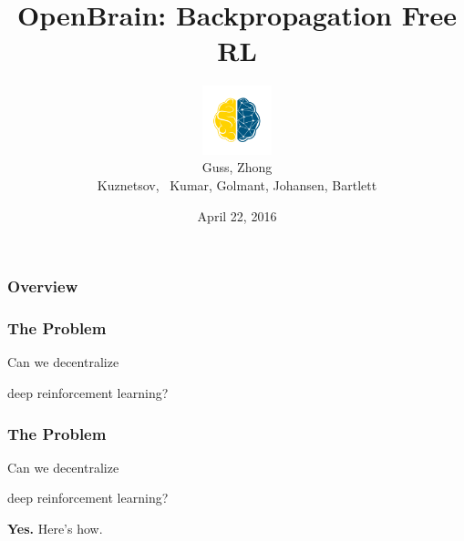 \documentclass{beamer}
\title[OpenBrain]{OpenBrain: Backpropagation Free RL}
\author[Guss \& Zhong et. al]{\includegraphics[height=2cm,width=2cm]{BlueGold_fill_small.png}\\   Guss,  Zhong  \\ Kuznetsov,  \ Kumar,  Golmant, Johansen,  Bartlett}
\date{April 22, 2016} %
\numberwithin{equation}{subsection}
\numberwithin{theorem}{subsection}
\begin{document}
\begin{frame}
\titlepage
\end{frame}


\begin{frame}

\begin{center}
\Huge
\end{center}


\frametitle{Overview}
\tableofcontents
\end{frame}

\begin{frame}
\frametitle{The Problem}
    \Huge{\centerline{Can we decentralize }}
    \Huge{\centerline{deep reinforcement learning?}}
\end{frame}

\begin{frame}
\frametitle{The Problem}
    \Huge{\centerline{Can we decentralize }}
    \Huge{\centerline{deep reinforcement learning?}}
    \Huge{\centerline{\textbf{Yes.} Here's how. }}
\end{frame}
\end{document}
